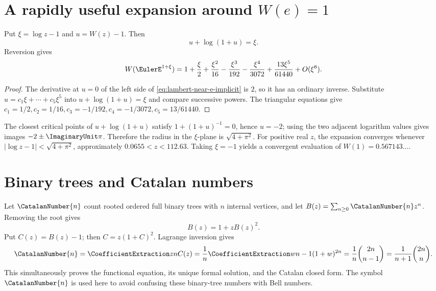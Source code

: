 \documentclass[11pt,a4paper,oneside,openany]{book}
\theoremstyle{definition}
\theoremstyle{remark}
\begin{document}
\section{A rapidly useful expansion around \texorpdfstring{$W(e)=1$}{W(e)=1}}
Put $\xi=\log z-1$ and $u=W(z)-1$.  Then
\begin{equation}\label{eq:lambert-near-e-implicit}
 u+\log(1+u)=\xi.
\end{equation}
Reversion gives
\begin{equation}\label{eq:lambert-near-e}
 W(\EulerE^{1+\xi})=1+\frac{\xi}{2}+\frac{\xi^2}{16}
 -\frac{\xi^3}{192}-\frac{\xi^4}{3072}
 +\frac{13\xi^5}{61440}+O(\xi^6).
\end{equation}
\begin{proof}
The derivative at $u=0$ of the left side of
\eqref{eq:lambert-near-e-implicit} is $2$, so it has an ordinary inverse.
Substitute $u=c_1\xi+\cdots+c_5\xi^5$ into
$u+\log(1+u)=\xi$ and compare successive powers.  The triangular equations give
$c_1=1/2,c_2=1/16,c_3=-1/192,c_4=-1/3072,c_5=13/61440$.
\end{proof}
The closest critical points of $u+\log(1+u)$ satisfy
$1+(1+u)^{-1}=0$, hence $u=-2$; using the two adjacent logarithm values gives
images $-2\pm \ImaginaryUnit\pi$.  Therefore the radius in the $\xi$-plane is
$\sqrt{4+\pi^2}$.  For positive real $z$, the expansion converges whenever
$|\log z-1|<\sqrt{4+\pi^2}$, approximately
$0.0655<z<112.63$.  Taking $\xi=-1$ yields a convergent evaluation of
$W(1)=0.567143\ldots$.

\section{Binary trees and Catalan numbers}
Let $\CatalanNumber{n}$ count rooted ordered full binary trees with $n$ internal vertices, and
let $B(z)=\sum_{n\ge0}\CatalanNumber{n}z^n$.  Removing the root gives
\begin{equation}\label{eq:binary-tree-functional}
 B(z)=1+zB(z)^2.
\end{equation}
Put $C(z)=B(z)-1$; then $C=z(1+C)^2$.  Lagrange inversion gives
\begin{equation}\label{eq:catalan-lagrange}
 \CatalanNumber{n}=\CoefficientExtraction znC(z)=\frac1n\CoefficientExtraction w{n-1}(1+w)^{2n}
 =\frac1n\binom{2n}{n-1}=\frac1{n+1}\binom{2n}{n}.
\end{equation}
This simultaneously proves the functional equation, its unique formal solution,
and the Catalan closed form.  The symbol $\CatalanNumber{n}$ is used here to avoid confusing
these binary-tree numbers with Bell numbers.
\end{document}
